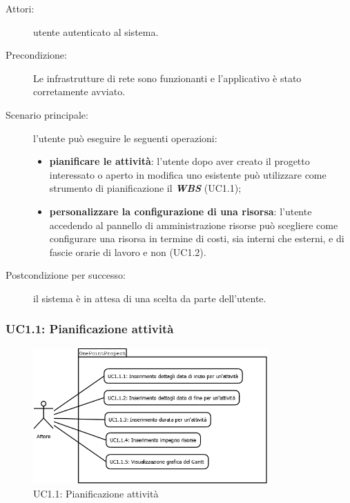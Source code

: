 \begin{description}
\item[Attori:]{utente autenticato al sistema.}
\item[Precondizione:]{Le infrastrutture di rete sono funzionanti e l\textquoteright{}applicativo \`{e} stato corretamente avviato.}
\item[Scenario principale:]{l\textquoteright{}utente pu\`{o} eseguire le seguenti operazioni:
	\begin{itemize}
	\item \textbf{pianificare le attivit\`{a}}: l\textquoteright{}utente dopo aver creato il progetto interessato o aperto in modifica uno esistente pu\`{o} utilizzare come strumento di pianificazione il \textit{\textbf{WBS}} (UC1.1);
	\item \textbf{personalizzare la configurazione di una risorsa}: l\textquoteright{}utente accedendo al pannello di amministrazione risorse pu\`{o} scegliere come configurare una risorsa in termine di costi, sia interni che esterni, e di fascie orarie di lavoro e non (UC1.2).
	\end{itemize}}
\item[Postcondizione per successo:]{il sistema \`{e} in attesa di una scelta da parte dell\textquoteright{}utente.}
\end{description}

\subsubsection[UC1.1: Pianificazione attivit\`{a}]{UC1.1: Pianificazione attivit\`{a}}
\begin{figure}[H]
\begin{center}
\includegraphics[width=0.80\textwidth]{img/UC/UC1.1.png}
\caption{UC1.1: Pianificazione attivit\`{a}}
\label{fig:UC1.1}
\end{center}
\end{figure}

